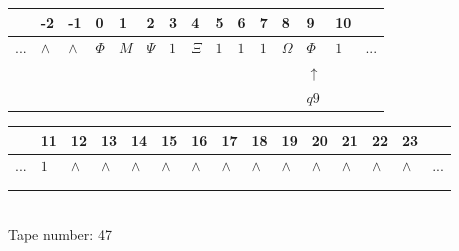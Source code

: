\documentclass[11pt]{article}
\begin{document}
\begin{table}[H]
\centering
\begin{tabular}{lllllllllllllll}
 & -2 & -1 & 0 & 1 & 2 & 3 & 4 & 5 & 6 & 7 & 8 & 9 & 10 & \\
\hline
$...$ & \multicolumn{1}{|l|}{$\wedge$} & \multicolumn{1}{|l|}{$\wedge$} & \multicolumn{1}{|l|}{$\Phi$} & \multicolumn{1}{|l|}{$M$} & \multicolumn{1}{|l|}{$\Psi$} & \multicolumn{1}{|l|}{$1$} & \multicolumn{1}{|l|}{$\Xi$} & \multicolumn{1}{|l|}{$1$} & \multicolumn{1}{|l|}{$1$} & \multicolumn{1}{|l|}{$1$} & \multicolumn{1}{|l|}{$\Omega$} & \multicolumn{1}{|l|}{$\Phi$} & \multicolumn{1}{|l|}{$1$} & $...$\\
\hline
&  &  &  &  &  &  &  &  &  &  &  & $\uparrow$ &  &  \\
&  &  &  &  &  &  &  &  &  &  &  & $ q9 $ &  &  \\
\end{tabular}
\begin{tabular}{lllllllllllllll}
 & 11 & 12 & 13 & 14 & 15 & 16 & 17 & 18 & 19 & 20 & 21 & 22 & 23 & \\
\hline
$...$ & \multicolumn{1}{|l|}{$1$} & \multicolumn{1}{|l|}{$\wedge$} & \multicolumn{1}{|l|}{$\wedge$} & \multicolumn{1}{|l|}{$\wedge$} & \multicolumn{1}{|l|}{$\wedge$} & \multicolumn{1}{|l|}{$\wedge$} & \multicolumn{1}{|l|}{$\wedge$} & \multicolumn{1}{|l|}{$\wedge$} & \multicolumn{1}{|l|}{$\wedge$} & \multicolumn{1}{|l|}{$\wedge$} & \multicolumn{1}{|l|}{$\wedge$} & \multicolumn{1}{|l|}{$\wedge$} & \multicolumn{1}{|l|}{$\wedge$} & $...$\\
\hline
&  &  &  &  &  &  &  &  &  &  &  &  &  &  \\
&  &  &  &  &  &  &  &  &  &  &  &  &  &  \\
\end{tabular}
\\
Tape number: 47
\noindent\makebox[\linewidth]{\hdashrule{\textwidth}{1pt}{1pt}}\end{table}
\clearpage
\end{document}
